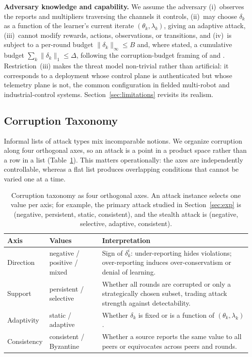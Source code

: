 \documentclass{article}
\begin{document}
\textbf{Adversary knowledge and capability.} We assume the adversary (i)~observes the reports and multipliers traversing the channels it controls, (ii)~may choose $\delta_k$ as a function of the learner's current iterate $(\theta_k,\lambda_k)$, giving an adaptive attack, (iii)~cannot modify rewards, actions, observations, or transitions, and (iv)~is subject to a per-round budget $\|\delta_k\|_\infty \le B$ and, where stated, a cumulative budget $\sum_k\|\delta_k\|_1 \le \Delta$, following the corruption-budget framing of \citet{lykouris2024corruption} and \citet{ye2024towards}. Restriction~(iii) makes the threat model non-trivial rather than artificial: it corresponds to a deployment whose control plane is authenticated but whose telemetry plane is not, the common configuration in fielded multi-robot and industrial-control systems. Section~\ref{sec:limitations} revisits its realism.

\subsection{Corruption Taxonomy}

Informal lists of attack types mix incomparable notions. We organize corruption along four orthogonal axes, so an attack is a point in a product space rather than a row in a list (Table~\ref{tab:taxonomy}). This matters operationally: the axes are independently controllable, whereas a flat list produces overlapping conditions that cannot be varied one at a time.

\begin{table}[t]
\caption{Corruption taxonomy as four orthogonal axes. An attack instance selects one value per axis; for example, the primary attack studied in Section~\ref{sec:exp} is (negative, persistent, static, consistent), and the stealth attack is (negative, selective, adaptive, consistent).}
\label{tab:taxonomy}
\centering
\small
\begin{tabular}{@{}llp{6.4cm}@{}}
\toprule
\textbf{Axis} & \textbf{Values} & \textbf{Interpretation} \\
\midrule
Direction & negative / positive / mixed & Sign of $\delta^i_k$: under-reporting hides violations; over-reporting induces over-conservatism or denial of learning. \\
Support & persistent / selective & Whether all rounds are corrupted or only a strategically chosen subset, trading attack strength against detectability. \\
Adaptivity & static / adaptive & Whether $\delta_k$ is fixed or is a function of $(\theta_k,\lambda_k)$. \\
Consistency & consistent / Byzantine & Whether a source reports the same value to all peers or equivocates across peers and rounds. \\
\bottomrule
\end{tabular}
\end{table}
\end{document}

